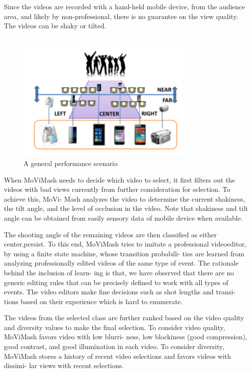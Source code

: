 \documentclass{sig-alternate}
\begin{document}
Since the videos are recorded with a hand-held mobile device,
from the audience area, and likely by non-professional, there is no
guarantee on the view quality. The videos can be shaky or tilted. \\\\
\begin{figure}
    \centering
    \includegraphics{img1.png}
    \caption{A general performance scenario}
    \label{fig:my_label}
\end{figure}
 When MoViMash needs to decide which
video to select, it first filters out the videos with bad views currently
from further consideration for selection. To achieve this, MoVi-
Mash analyzes the video to determine the current shakiness, the tilt
angle, and the level of occlusion in the video. Note that shakiness and tilt angle can be obtained from easily sensory data of mobile
device when available.

The shooting angle of the remaining videos are then classified as
either center,persist. To this end, MoViMash tries to imitate a professional videoeditor, by using a finite state machine, whose transition probabili-
ties are learned from analyzing professionally edited videos of the
same type of event. The rationale behind the inclusion of learn-
ing is that, we have observed that there are no generic editing rules
that can be precisely defined to work with all types of events. The
video editors make fine decisions such as shot lengths and transi-
tions based on their experience which is hard to enumerate.


The videos from the selected class are further ranked based on
the video quality and diversity values to make the final selection.
To consider video quality, MoViMash favors video with low blurri-
ness, low blockiness (good compression), good contrast, and good
illumination in each video. To consider diversity, MoViMash stores
a history of recent video selections and favors videos with dissimi-
lar views with recent selections.
\end{document}
